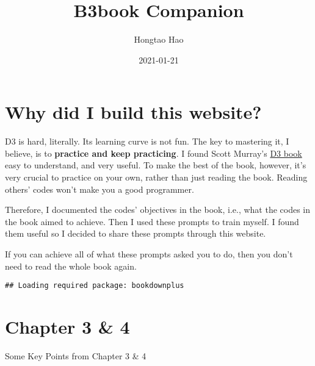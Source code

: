 \documentclass[
]{book}
\title{B3book Companion}
\author{Hongtao Hao}
\date{2021-01-21}
\begin{document}
\maketitle

{
\setcounter{tocdepth}{1}
\tableofcontents
}
\hypertarget{why-did-i-build-this-website}{%
\chapter*{Why did I build this website?}\label{why-did-i-build-this-website}}

D3 is hard, literally. Its learning curve is not fun. The key to mastering it, I believe, is to \textbf{practice and keep practicing}. I found Scott Murray's \href{https://alignedleft.com/work/d3-book-2e}{D3 book} easy to understand, and very useful. To make the best of the book, however, it's very crucial to practice on your own, rather than just reading the book. Reading others' codes won't make you a good programmer.

Therefore, I documented the codes' objectives in the book, i.e., what the codes in the book aimed to achieve. Then I used these prompts to train myself. I found them useful so I decided to share these prompts through this website.

If you can achieve all of what these prompts asked you to do, then you don't need to read the whole book again.

\begin{verbatim}
## Loading required package: bookdownplus
\end{verbatim}

\mainmatter

\hypertarget{chapter3_and_4}{%
\chapter{Chapter 3 \& 4}\label{chapter3_and_4}}

Some Key Points from Chapter 3 \& 4
\end{document}
